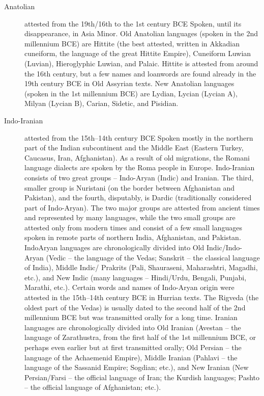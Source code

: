 \begin{description}
\item [Anatolian]  attested from the 19th/16th to the 1st century BCE
Spoken, until its disappearance, in Asia Minor. Old Anatolian languages (spoken in
the 2nd millennium BCE) are Hittite (the best attested, written in Akkadian cuneiform,
the language of the great Hittite Empire), Cuneiform Luwian (Luvian), Hieroglyphic
Luwian, and Palaic. Hittite is attested from around the 16th century, but a
few names and loanwords are found already in the 19th century BCE in Old Assyrian
texts. New Anatolian languages (spoken in the 1st millennium BCE) are Lydian,
Lycian (Lycian A), Milyan (Lycian B), Carian, Sidetic, and Pisidian.

\item[Indo-Iranian] attested from the 15th–14th century BCE
Spoken mostly in the northern part of the Indian subcontinent and the Middle East
(Eastern Turkey, Caucasus, Iran, Afghanistan). As a result of old migrations, the
Romani language dialects are spoken by the Roma people in Europe. Indo-Iranian
consists of two great groups – Indo-Aryan (Indic) and Iranian. The third, smaller
group is Nuristani (on the border between Afghanistan and Pakistan), and the fourth,
disputably, is Dardic (traditionally considered part of Indo-Aryan). The two major
groups are attested from ancient times and represented by many languages, while
the two small groups are attested only from modern times and consist of a few small
languages spoken in remote parts of northern India, Afghanistan, and Pakistan. IndoAryan
languages are chronologically divided into Old Indic/Indo-Aryan (Vedic – the
language of the Vedas; Sanskrit – the classical language of India), Middle Indic/
Prakrits (Pali, Shauraseni, Maharashtri, Magadhi, etc.), and New Indic (many languages
– Hindi/Urdu, Bengali, Punjabi, Marathi, etc.). Certain words and names of
Indo-Aryan origin were attested in the 15th–14th century BCE in Hurrian texts. The
Rigveda (the oldest part of the Vedas) is usually dated to the second half of the 2nd
millennium BCE but was transmitted orally for a long time. Iranian languages are
chronologically divided into Old Iranian (Avestan – the language of Zarathustra,
from the first half of the 1st millennium BCE, or perhaps even earlier but at first
transmitted orally; Old Persian – the language of the Achaemenid Empire), Middle
Iranian (Pahlavi – the language of the Sassanid Empire; Sogdian; etc.), and New
Iranian (New Persian/Farsi – the official language of Iran; the Kurdish languages;
Pashto – the official language of Afghanistan; etc.).


\end{description}
